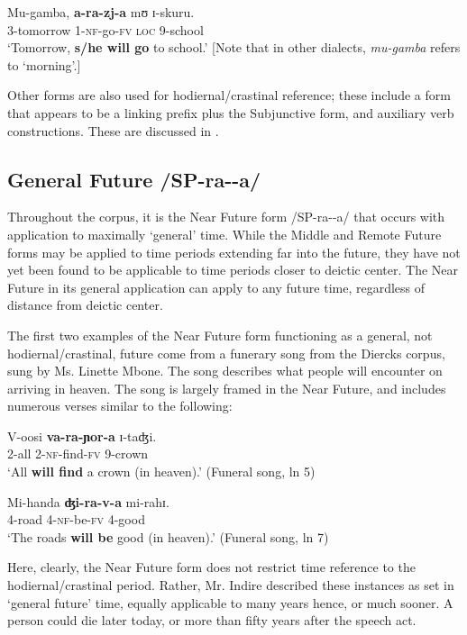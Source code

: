 \documentclass[output=paper]{langsci/langscibook}
\begin{document}
\ea\label{ex:sarvasy:1}
\gll Mu-gamba,   \textbf{a-ra-zj-a}   mʊ  ɪ-skuru. \\
3-tomorrow  1-\textsc{nf}-go-\textsc{fv}  \textsc{loc}  9-school \\
\glt ‘Tomorrow, \textbf{s/he will go} to school.’ [Note that in other dialects, \textit{mu-gamba} refers to ‘morning’.] \z

Other forms are also used for hodiernal/crastinal reference; these include a form that appears to be a linking prefix plus the Subjunctive form, and auxiliary verb constructions. These are discussed in .

\subsection{General Future /SP-ra-{\longrule}-a/}
\label{sec:sarvasy:3.2}

Throughout the corpus, it is the Near Future form /SP-ra-{\longrule}-a/ that occurs with application to maximally ‘general’ time. While the Middle and Remote Future forms may be applied to time periods extending far into the future, they have not yet been found to be applicable to time periods closer to deictic center. The Near Future in its general application can apply to any future time, regardless of distance from deictic center. 

The first two examples of the Near Future form functioning as a general, not hodiernal/crastinal, future come from a funerary song from the Diercks corpus, sung by Ms. Linette Mbone. The song describes what people will encounter on arriving in heaven. The song is largely framed in the Near Future, and includes numerous verses similar to the following:

\ea\label{ex:sarvasy:2}
\gll V-oosi   \textbf{va-ra-ɲor-a}     ɪ-taʤi. \\
2-all 2-\textsc{nf}-find-\textsc{fv}    9-crown \\
\glt ‘All \textbf{will find} a crown (in heaven).’ (Funeral song, ln 5)
\z

\ea\label{ex:sarvasy:3}
\gll Mi-handa   \textbf{ʤi-ra-v-a}   mi-rahɪ. \\
4-road 4-\textsc{nf}-be-\textsc{fv} 4-good \\
\glt ‘The roads \textbf{will be} good (in heaven).’ (Funeral song, ln 7)
\z

Here, clearly, the Near Future form does not restrict time reference to the hodiernal/crastinal period. Rather, Mr. Indire described these instances as set in ‘general future’ time, equally applicable to many years hence, or much sooner. A person could die later today, or more than fifty years after the speech act.
\end{document}
